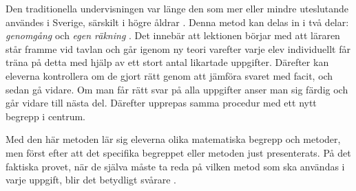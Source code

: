 
\textcolor{lila}{Den traditionella undervisningen var länge den som mer eller mindre uteslutande användes i Sverige, särskilt i högre åldrar \cite{Namnaren}. Denna metod kan delas in i två delar: \textsl{genomgång} och \textsl{egen räkning} \cite{traditionellMatte}. Det innebär att lektionen börjar med att läraren står framme vid tavlan och går igenom ny teori varefter varje elev individuellt får träna på detta med hjälp av ett stort antal likartade uppgifter. Därefter kan eleverna kontrollera om de gjort rätt genom att jämföra svaret med facit, och sedan gå vidare. Om man får rätt svar på alla uppgifter anser man sig färdig och går vidare till nästa del. Därefter upprepas samma procedur med ett nytt begrepp i centrum.} 
    
\textcolor{lila}{Med den här metoden lär sig eleverna olika matematiska begrepp och metoder, men först efter att det specifika begreppet eller metoden just presenterats. På det faktiska provet, när de själva måste ta reda på vilken metod som ska användas i varje uppgift, blir det betydligt svårare \cite{TheElephant}.}
    



